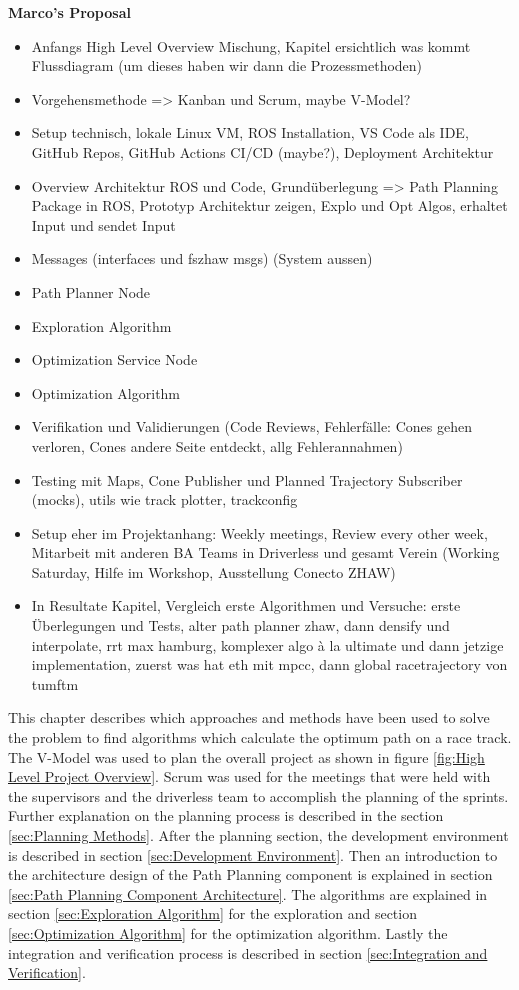 \textbf{Marco's Proposal}
\begin{itemize}
    \item Anfangs High Level Overview Mischung, Kapitel ersichtlich was kommt Flussdiagram (um dieses haben wir dann die Prozessmethoden)
    \item Vorgehensmethode => Kanban und Scrum, maybe V-Model?
    \item Setup technisch, lokale Linux VM, ROS Installation, VS Code als IDE, GitHub Repos, GitHub Actions CI/CD (maybe?), Deployment Architektur
    \item Overview Architektur ROS und Code, Grundüberlegung => Path Planning Package in ROS, Prototyp Architektur zeigen, Explo und Opt Algos, erhaltet Input und sendet Input
    \item Messages (interfaces und fszhaw msgs) (System aussen)
    \item Path Planner Node
    \item Exploration Algorithm
    \item Optimization Service Node
    \item Optimization Algorithm
    \item Verifikation und Validierungen (Code Reviews, Fehlerfälle: Cones gehen verloren, Cones andere Seite entdeckt, allg Fehlerannahmen)
    \item Testing mit Maps, Cone Publisher und Planned Trajectory Subscriber (mocks), utils wie track plotter, trackconfig
    \item Setup eher im Projektanhang: Weekly meetings, Review every other week, Mitarbeit mit anderen BA Teams in Driverless und gesamt Verein (Working Saturday, Hilfe im Workshop, Ausstellung Conecto ZHAW)
    \item In Resultate Kapitel, Vergleich erste Algorithmen und Versuche: erste Überlegungen und Tests, alter path planner zhaw, dann densify und interpolate, rrt max hamburg, komplexer algo à la ultimate und dann jetzige implementation, zuerst was hat eth mit mpcc, dann global racetrajectory von tumftm
\end{itemize}

This chapter describes which approaches and methods have been used to solve the problem to find algorithms which calculate the optimum path on a race track. The V-Model was used to plan the overall project as shown in figure \ref{fig:High Level Project Overview}. Scrum was used for the meetings that were held with the supervisors and the driverless team to accomplish the planning of the sprints. Further explanation on the planning process is described in the section \ref{sec:Planning Methods}. After the planning section, the development environment is described in section \ref{sec:Development Environment}. Then an introduction to the architecture design of the Path Planning component is explained in section \ref{sec:Path Planning Component Architecture}. The algorithms are explained in section \ref{sec:Exploration Algorithm} for the exploration and section \ref{sec:Optimization Algorithm} for the optimization algorithm. Lastly the integration and verification process is described in section \ref{sec:Integration and Verification}.

